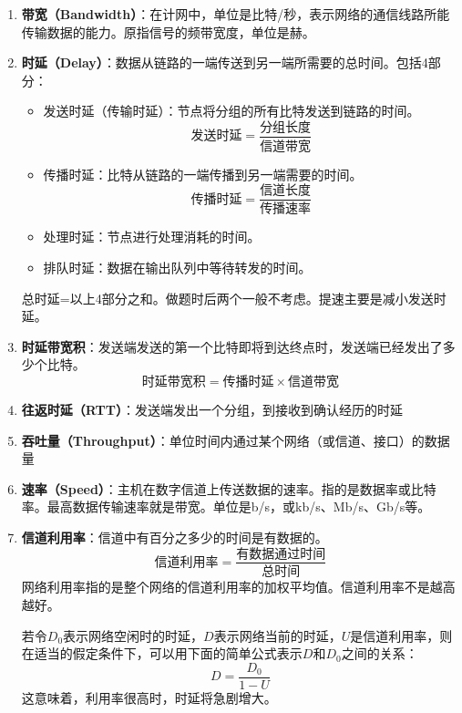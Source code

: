 \documentclass[12pt, a4paper, oneside]{ctexart}
\begin{document}
\begin{enumerate}
    \item {\bf 带宽（Bandwidth）}：在计网中，单位是比特/秒，表示网络的通信线路所能传输数据的能力。原指信号的频带宽度，单位是赫。
    \item {\bf 时延（Delay）}：数据从链路的一端传送到另一端所需要的总时间。包括4部分：
    \begin{itemize}
        \item 发送时延（传输时延）：节点将分组的所有比特发送到链路的时间。
        \begin{equation*}
            \text{发送时延}=\frac{\text{分组长度}}{\text{信道带宽}}
        \end{equation*}
        \item 传播时延：比特从链路的一端传播到另一端需要的时间。
        \begin{equation*}
            \text{传播时延}=\frac{\text{信道长度}}{\text{传播速率}}
        \end{equation*}
        \item 处理时延：节点进行处理消耗的时间。
        \item 排队时延：数据在输出队列中等待转发的时间。
    \end{itemize}
    总时延=以上4部分之和。做题时后两个一般不考虑。提速主要是减小发送时延。
    \item {\bf 时延带宽积}：发送端发送的第一个比特即将到达终点时，发送端已经发出了多少个比特。
    \begin{equation*}
        \text{时延带宽积}=\text{传播时延}\times \text{信道带宽}
    \end{equation*}
    \item {\bf 往返时延（RTT）}：发送端发出一个分组，到接收到确认经历的时延
    \item {\bf 吞吐量（Throughput）}：单位时间内通过某个网络（或信道、接口）的数据量
    \item {\bf 速率（Speed）}：主机在数字信道上传送数据的速率。指的是数据率或比特率。最高数据传输速率就是带宽。单位是b/s，或kb/s、Mb/s、Gb/s等。
    \item {\bf 信道利用率}：信道中有百分之多少的时间是有数据的。
    \begin{equation*}
        \text{信道利用率}=\frac{\text{有数据通过时间}}{\text{总时间}}
    \end{equation*}
    网络利用率指的是整个网络的信道利用率的加权平均值。信道利用率不是越高越好。

    若令$D_0$表示网络空闲时的时延，$D$表示网络当前的时延，$U$是信道利用率，则在适当的假定条件下，可以用下面的简单公式表示$D$和$D_0$之间的关系：
    \begin{equation*}
        D=\frac{D_0}{1-U}
    \end{equation*}
    这意味着，利用率很高时，时延将急剧增大。
\end{enumerate}
\end{document}
